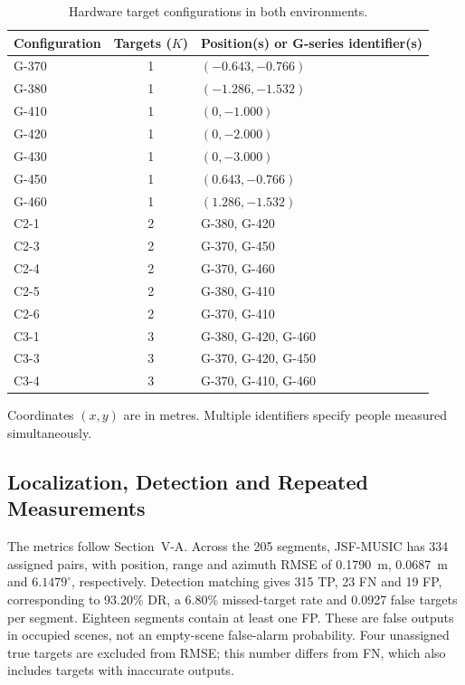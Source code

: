 \begin{table}[t]
\centering
\caption{Hardware target configurations in both environments.}
\label{tab:configurations}
\footnotesize
\setlength{\tabcolsep}{3pt}
\begin{tabular}{lcl}
\hline
Configuration & Targets ($K$) & Position(s) or G-series identifier(s) \\
\hline
G-370 & 1 & $(-0.643,-0.766)$ \\
G-380 & 1 & $(-1.286,-1.532)$ \\
G-410 & 1 & $(0,-1.000)$ \\
G-420 & 1 & $(0,-2.000)$ \\
G-430 & 1 & $(0,-3.000)$ \\
G-450 & 1 & $(0.643,-0.766)$ \\
G-460 & 1 & $(1.286,-1.532)$ \\
C2-1 & 2 & G-380, G-420 \\
C2-3 & 2 & G-370, G-450 \\
C2-4 & 2 & G-370, G-460 \\
C2-5 & 2 & G-380, G-410 \\
C2-6 & 2 & G-370, G-410 \\
C3-1 & 3 & G-380, G-420, G-460 \\
C3-3 & 3 & G-370, G-420, G-450 \\
C3-4 & 3 & G-370, G-410, G-460 \\
\hline
\end{tabular}
\par\smallskip\parbox{.98\linewidth}{\scriptsize Coordinates $(x,y)$ are in metres. Multiple identifiers specify people measured simultaneously.}
\end{table}

\subsection{Localization, Detection and Repeated Measurements}
The metrics follow Section~V-A. Across the 205 segments, JSF-MUSIC has 334 assigned pairs, with position, range and azimuth RMSE of 0.1790~m, 0.0687~m and $6.1479^\circ$, respectively. Detection matching gives 315 TP, 23 FN and 19 FP, corresponding to 93.20\% DR, a 6.80\% missed-target rate and 0.0927 false targets per segment. Eighteen segments contain at least one FP. These are false outputs in occupied scenes, not an empty-scene false-alarm probability. Four unassigned true targets are excluded from RMSE; this number differs from FN, which also includes targets with inaccurate outputs.

